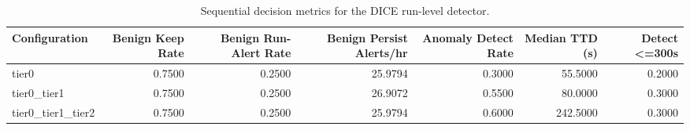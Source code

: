 \begin{table}[t]
\centering
\caption{Sequential decision metrics for the DICE run-level detector.}
\label{tab:dice_sequential_metrics}
\footnotesize
\begin{tabular}{lrrrrrr}
\toprule
Configuration & Benign Keep Rate & Benign Run-Alert Rate & Benign Persist Alerts/hr & Anomaly Detect Rate & Median TTD (s) & Detect <=300s \\
\midrule
tier0 & 0.7500 & 0.2500 & 25.9794 & 0.3000 & 55.5000 & 0.2000 \\
tier0_tier1 & 0.7500 & 0.2500 & 26.9072 & 0.5500 & 80.0000 & 0.3000 \\
tier0_tier1_tier2 & 0.7500 & 0.2500 & 25.9794 & 0.6000 & 242.5000 & 0.3000 \\
\bottomrule
\end{tabular}

\end{table}
